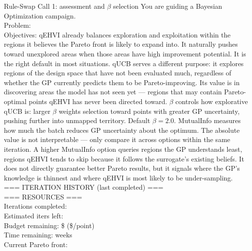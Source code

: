 \begin{fragmentbox}{Rule-Swap Call 1: assessment and $\beta$ selection}
\promptfont
You are guiding a Bayesian Optimization campaign.\\
Problem: \\
Objectives: 
\vspace{0.35em}
qEHVI already balances exploration and exploitation within the regions it believes the
Pareto front is likely to expand into. It naturally pushes toward unexplored areas
when those areas have high improvement potential. It is the right default in most
situations.
\vspace{0.35em}
qUCB serves a different purpose: it explores regions of the design space that have not
been evaluated much, regardless of whether the GP currently predicts them to be
Pareto-improving. Its value is in discovering areas the model has not seen yet ---
regions that may contain Pareto-optimal points qEHVI has never been directed toward.
\vspace{0.35em}
$\beta$ controls how explorative qUCB is: larger $\beta$ weights selection toward
points with greater GP uncertainty, pushing further into unmapped territory. Default
$\beta = 2.0$.
\vspace{0.35em}
MutualInfo measures how much the batch reduces GP uncertainty about the optimum. The
absolute value is not interpretable --- only compare it across options within the same
iteration. A higher MutualInfo option queries regions the GP understands least,
regions qEHVI tends to skip because it follows the surrogate's existing beliefs. It
does not directly guarantee better Pareto results, but it signals where the GP's
knowledge is thinnest and where qEHVI is most likely to be under-sampling.
\vspace{0.35em}
=== ITERATION HISTORY (last  completed) ===\\
\vspace{0.35em}
=== RESOURCES ===\\
Iterations completed: \\
Estimated iters left: \\
Budget remaining: \$ (\$/point)\\
Time remaining:  weeks\\
Current Pareto front: 
\vspace{0.35em}

\end{fragmentbox}
